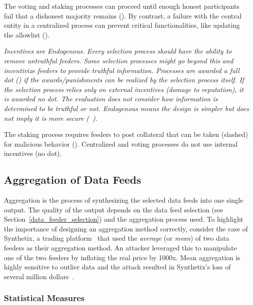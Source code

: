 The voting and staking processes can proceed until enough honest participants fail that a dishonest majority remains (\full). By contrast, a failure with the central entity in a centralized process can prevent critical functionalities, like updating the allowlist (\prt).

\emph{Incentives are Endogenous.} \textit{Every selection process should have the ability to remove untruthful feeders. Some selection processes might go beyond this and incentivize feeders to provide truthful information. Processes are awarded a full dot (\full) if the awards/punishments can be realized by the selection process itself. If the selection process relies only on external incentives (\eg damage to reputation), it is awarded no dot. The evaluation does not consider how information is determined to be truthful or not. Endogenous means the design is simpler but does not imply it is more secure (\cf~\cite{FoBo19}).}

The staking process requires feeders to post collateral that can be taken (\ie slashed) for malicious behavior (\full). Centralized and voting processes do not use internal incentives (no dot).


\subsection{Aggregation of Data Feeds}\label{aggregation} 

Aggregation is the process of synthesizing the selected data feeds into one single output. The quality of the output depends on the data feed selection (see Section~\ref{data_feeder_selection}) and the aggregation process used. To highlight the importance of designing an aggregation method correctly, consider the case of Synthetix, a trading platform~\cite{synthetix} that used the \textit{average} (or \textit{mean}) of two data feeders as their aggregation method. An attacker leveraged this to manipulate one of the two feeders by inflating the real price by 1000x. Mean aggregation is highly sensitive to outlier data and the attack resulted in Synthetix's loss of several million dollars~\cite{synthetixIncident}.

\subsubsection{Statistical Measures}

